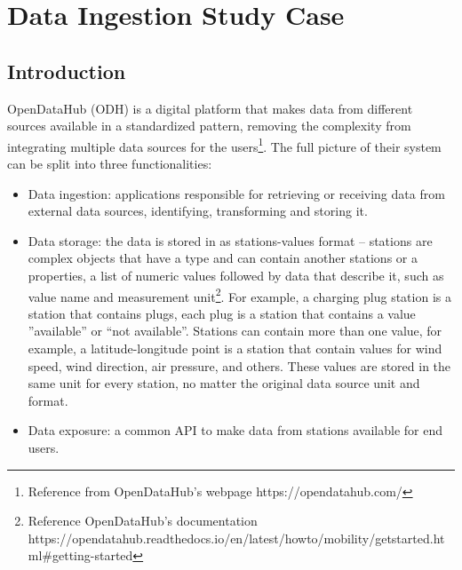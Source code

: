 

\newcommand{\sla}{\textbackslash}

\newcommand{\cmd}[1]{\textsf{#1}}

\newcommand{\pkg}[1]{\textsf{#1}}

\newcommand{\ltxcmd}[1]{\cmd{\sla{}#1}}

\chapter{Data Ingestion Study Case}
\label{chap:dataingestion}

\section{Introduction}
\label{sec:introductioning}
OpenDataHub (ODH) is a digital platform that makes data from different sources available in a standardized pattern, removing the complexity from integrating multiple data sources for the users\footnote{Reference from OpenDataHub's webpage https://opendatahub.com/}. The full picture of their system can be split into three functionalities:

\begin{itemize}
    \item Data ingestion: applications responsible for retrieving or receiving data from external data sources, identifying, transforming and storing it.
    \item Data storage: the data is stored in as stations-values format  – stations are complex objects that have a type and can contain another stations or a properties, a list of numeric values followed by data that describe it, such as value name and measurement unit\footnote{Reference OpenDataHub's documentation https://opendatahub.readthedocs.io/en/latest/howto/mobility/getstarted.html#getting-started}. For example, a charging plug station is a station that contains plugs, each plug is a station that contains a value ”available” or “not available”. Stations can contain more than one value, for example, a latitude-longitude point is a station that contain values for wind speed, wind direction, air pressure, and others. These values are stored in the same unit for every station, no matter the original data source unit and format.
    \item Data exposure: a common API to make data from stations available for end users.
\end{itemize}


